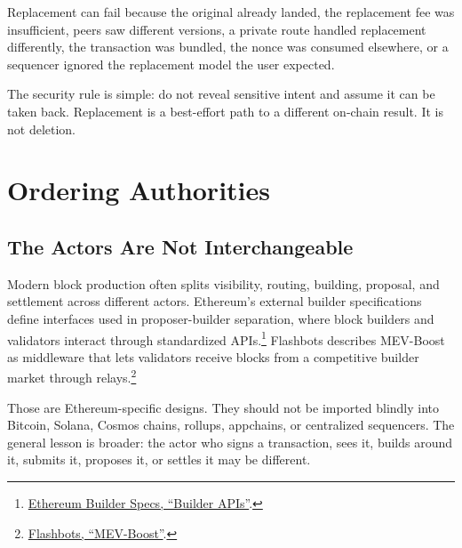 Replacement can fail because the original already landed, the replacement fee was insufficient, peers saw different versions, a private route handled replacement differently, the transaction was bundled, the nonce was consumed elsewhere, or a sequencer ignored the replacement model the user expected.

The security rule is simple: do not reveal sensitive intent and assume it can be taken back. Replacement is a best-effort path to a different on-chain result. It is not deletion.

\section{Ordering Authorities}

\subsection{The Actors Are Not Interchangeable}

Modern block production often splits visibility, routing, building, proposal, and settlement across different actors. Ethereum's external builder specifications define interfaces used in proposer-builder separation, where block builders and validators interact through standardized APIs.\footnote{\href{https://ethereum.github.io/builder-specs/}{Ethereum Builder Specs, ``Builder APIs''}.} Flashbots describes MEV-Boost as middleware that lets validators receive blocks from a competitive builder market through relays.\footnote{\href{https://docs.flashbots.net/flashbots-mev-boost/introduction}{Flashbots, ``MEV-Boost''}.}

Those are Ethereum-specific designs. They should not be imported blindly into Bitcoin, Solana, Cosmos chains, rollups, appchains, or centralized sequencers. The general lesson is broader: the actor who signs a transaction, sees it, builds around it, submits it, proposes it, or settles it may be different.

